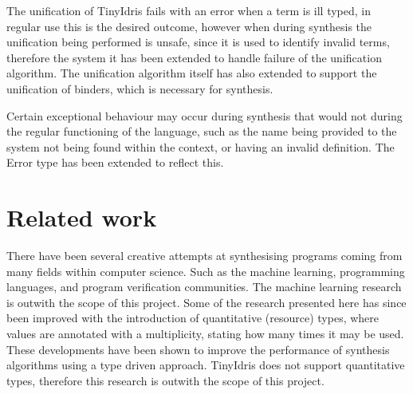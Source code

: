 \documentclass[a4paper]{article}
\begin{document}
The unification of TinyIdris fails with an error when a term is ill typed, 
in regular use this is the desired outcome, however when during synthesis
the unification being performed is unsafe, since it is used to identify invalid terms,
therefore the system it has been extended to handle failure of the unification algorithm.
The unification algorithm itself has also extended to support the unification of binders,
which is necessary for synthesis.  

Certain exceptional behaviour may occur during synthesis that would
not during the regular functioning of the language, such as the name
being provided to the system not being found within the context,
or having an invalid definition. The Error type has been extended to reflect this. 

\clearpage

\section{Related work}
\label{sec:orgbfa1aeb}

There have been several creative attempts at synthesising programs coming from 
many fields within computer science. Such as the machine learning, programming
languages, and program verification communities. 
The machine learning research is outwith the scope of this project. 
Some of the research presented here has since been improved with the
introduction of quantitative (resource) types, where values are
annotated with a multiplicity, stating how many times it may be used. 
These developments have been shown to improve the performance of synthesis algorithms 
using a type driven approach. TinyIdris does not support quantitative
types, therefore this research is outwith the scope of this project.
\end{document}
